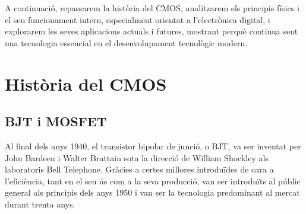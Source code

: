 \documentclass[11pt,a4paper]{article}
\begin{document}
A continuació, repassarem la història del CMOS, analitzarem els principis físics i el seu funcionament intern, especialment orientat a l'electrònica digital, i explorarem les seves aplicacions actuals i futures, mostrant perquè continua sent una tecnologia essencial en el desenvolupament tecnològic modern.

\section{Història del CMOS}

\subsection{BJT i MOSFET}


Al final dels anys 1940, el transistor bipolar de junció, o BJT, va ser inventat per John Bardeen i Walter Brattain sota la direcció de William Shockley als laboratoris Bell Telephone. Gràcies a certes millores introduïdes de cara a l'eficiència, tant en el seu ús com a la seva producció, van ser introduïts al públic general als principis dels anys 1950 i van ser la tecnologia predominant al mercat durant trenta anys.
\end{document}
